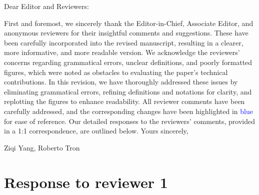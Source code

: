 \documentclass{article}
\newcommand{\new}[1]{\textcolor{blue}{#1}}
\begin{document}
	




\noindent
Dear Editor and Reviewers:

\vspace{0.2cm}
\noindent
First and foremost, we sincerely thank the Editor-in-Chief, Associate Editor, and anonymous reviewers for their insightful comments and suggestions. These have been carefully incorporated into the revised manuscript, resulting in a clearer, more informative, and more readable version. We acknowledge the reviewers' concerns regarding grammatical errors, unclear definitions, and poorly formatted figures, which were noted as obstacles to evaluating the paper's technical contributions. In this revision, we have thoroughly addressed these issues by eliminating grammatical errors, refining definitions and notations for clarity, and replotting the figures to enhance readability. All reviewer comments have been carefully addressed, and the corresponding changes have been highlighted in \new{blue} for ease of reference. Our detailed responses to the reviewers' comments, provided in a 1:1 correspondence, are outlined below.
\vspace{0.2cm}
\noindent
Yours sincerely,

\noindent
Ziqi Yang, Roberto Tron


\newpage
\section{Response to reviewer 1} 
\end{document}
